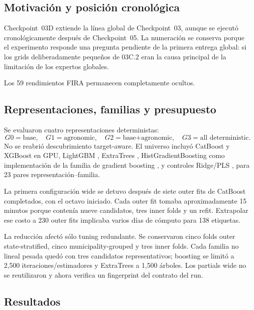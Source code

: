 \subsection{Motivación y posición cronológica}

Checkpoint~03D extiende la línea global de Checkpoint~03, aunque se ejecutó
cronológicamente después de Checkpoint~05. La numeración se conserva porque el experimento
responde una pregunta pendiente de la primera entrega global: si los grids deliberadamente
pequeños de 03C.2 eran la causa principal de la limitación de los expertos globales.

Los 59 rendimientos FIRA permanecen completamente ocultos.

\subsection{Representaciones, familias y presupuesto}

Se evaluaron cuatro representaciones deterministas:
\[
G0=\text{base},\quad
G1=\text{agronomic},\quad
G2=\text{base+agronomic},\quad
G3=\text{all deterministic}.
\]
No se reabrió descubrimiento target-aware. El universo incluyó CatBoost
\citep{CatBoost2018} y XGBoost \citep{XGBoost2016} en GPU, LightGBM
\citep{LightGBM2017}, ExtraTrees \citep{Geurts2006}, HistGradientBoosting como
implementación de la familia de gradient boosting \citep{Friedman2001}, y controles
Ridge/PLS \citep{HoerlKennard1970,Wold2001}, para 23 pares representación--familia.

La primera configuración wide se detuvo después de siete outer fits de CatBoost completados,
con el octavo iniciado. Cada outer fit tomaba aproximadamente 15 minutos porque contenía
nueve candidatos, tres inner folds y un refit. Extrapolar ese costo a 230 outer fits implicaba
varios días de cómputo para 138 etiquetas.

La reducción afectó sólo tuning redundante. Se conservaron cinco folds outer state-stratified,
cinco municipality-grouped y tres inner folds. Cada familia no lineal pesada quedó con tres
candidatos representativos; boosting se limitó a 2,500 iteraciones/estimadores y ExtraTrees a
1,500 árboles. Los partials wide no se reutilizaron y  ahora verifica un
fingerprint del contrato del run.

\subsection{Resultados}

